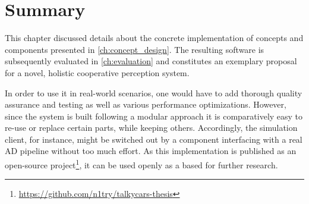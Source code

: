 \section{Summary}
\label{sec:implementation:summary}
This chapter discussed details about the concrete implementation of concepts and components presented in \cref{ch:concept_design}. The resulting software is subsequently evaluated in \cref{ch:evaluation} and constitutes an exemplary proposal for a novel, holistic cooperative perception system.

In order to use it in real-world scenarios, one would have to add thorough quality assurance and testing as well as various performance optimizations. However, since the system is built following a modular approach it is comparatively easy to re-use or replace certain parts, while keeping others. Accordingly, the simulation client, for instance, might be switched out by a component interfacing with a real AD pipeline without too much effort. As this implementation is published as an open-source project\footnote{\url{https://github.com/n1try/talkycars-thesis}}, it can be used openly as a based for further research. 